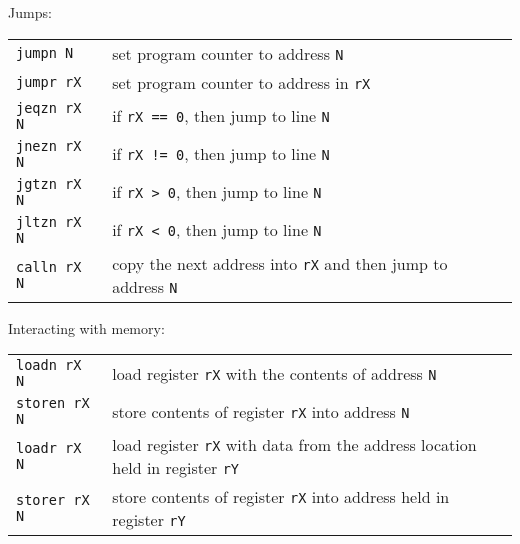 \documentclass[8pt,a4paper,compress,handout]{beamer}
\begin{document}
\begin{frame}[fragile]
Jumps:

\bigskip

\begin{tabular}{ll}
\lstinline$jumpn N$ & set program counter to address \lstinline$N$ \\
\lstinline$jumpr rX$ & set program counter to address in \lstinline$rX$ \\
\lstinline$jeqzn rX N$ & if \lstinline$rX == 0$, then jump to line \lstinline$N$ \\
\lstinline$jnezn rX N$ & if \lstinline$rX != 0$, then jump to line \lstinline$N$ \\
\lstinline$jgtzn rX N$ & if \lstinline$rX > 0$, then jump to line \lstinline$N$ \\
\lstinline$jltzn rX N$ & if \lstinline$rX < 0$, then jump to line \lstinline$N$ \\
\lstinline$calln rX N$ & copy the next address into \lstinline$rX$ and then jump to address \lstinline$N$
\end{tabular} 

\bigskip

Interacting with memory:

\bigskip

\begin{tabular}{ll}
\lstinline$loadn rX N$ & load register \lstinline$rX$ with the contents of address \lstinline$N$ \\
\lstinline$storen rX N$ & store contents of register \lstinline$rX$ into address \lstinline$N$ \\
\lstinline$loadr rX N$ & load register \lstinline$rX$ with data from the address location held in register \lstinline$rY$ \\
\lstinline$storer rX N$ & store contents of register \lstinline$rX$ into address held in register \lstinline$rY$ 
\end{tabular} 
\end{frame}
\end{document}
